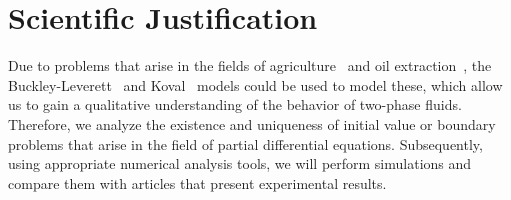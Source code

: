 \section{Scientific Justification}

Due to problems that arise in the fields of
agriculture~\cite{Richards1931,Tan2018} and oil
extraction~\cite{Cajuhi2019}, the
Buckley-Leverett~\cite{Buckley1942} and Koval~\cite{Koval1963} models
could be used to model these, which allow us to gain a qualitative
understanding of the behavior of two-phase fluids.
Therefore, we analyze the existence and uniqueness of initial
value or boundary problems
that arise in the field of partial differential equations.
Subsequently, using appropriate numerical analysis tools, we will perform simulations
and compare them with articles that present experimental results.
